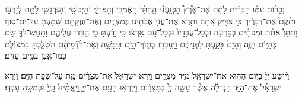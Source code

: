 \documentclass[twoside, openany, parskip=half, 11pt]{book}
\begin{document}
וְכָר֨וֹת עִמּ֜וֹ הַבְּֿרִ֗ית לָתֵ֡ת אֶת־אֶ֩רֶץ֩ הַכְּֿנַֽעֲנִ֨י הַֽחִתִּ֜י הָֽאֱמֹרִ֧י וְהַפְּֿרִזִּ֛י וְהַיְבוּסִ֥י וְהַגִּרְגָּשִׁ֖י לָתֵ֣ת לְזַרְע֑וֹ וַתָּ֨קֶם֙ אֶת־דְּבָרֶ֔יךָ כִּ֥י צַדִּ֖יק אָֽתָּה׃ וַתֵּ֥רֶא אֶת־עֳנִ֥י אֲבֹתֵ֖ינוּ בְּמִצְרָ֑יִם וְאֶת־זַֽעֲקָתָ֥ם שָׁמַ֖עְתָּ עַל־יַם־סֽוּף׃ וַתִּתֵּן֩ אֹתֹ֨ת וּמֹֽפְֿתִ֜ים בְּפַרְעֹ֤ה וּבְכָל־עֲבָדָיו֙ וּבְכָל־עַ֣ם אַרְצ֔וֹ כִּ֣י יָדַ֔עְתָּ כִּ֥י הֵזִ֖ידוּ עֲלֵיהֶ֑ם וַתַּֽעַשׂ־לְךָ֥ שֵׁ֖ם כְּהַיּ֥וֹם הַזֶּֽה׃
 וְהַיָּם֙ בָּקַ֣עְתָּ לִפְנֵיהֶ֔ם וַיַּֽעַבְר֥וּ בְתֽוֹךְ־הַיָּ֖ם בַּיַּבָּשָׁ֑ה וְאֶת־רֹ֨דְֿפֵיהֶ֜ם הִשְׁלַ֧כְתָּ בִמְצוֹלֹ֛ת כְּמוֹ־אֶ֖בֶן בְּמַ֥יִם עַזִּֽים׃

וַיּ֨וֹשַׁע
יְיָ֜ בַּיּ֥וֹם הַה֛וּא אֶת־יִשְׂרָאֵ֖ל מִיַּ֣ד מִצְרָ֑יִם וַיַּ֤רְא יִשְׂרָאֵל֙ אֶת־מִצְרַ֔יִם מֵ֖ת עַל־שְׂפַ֥ת הַיָּֽם׃
 וַיַּ֨רְא יִשְׂרָאֵ֜ל אֶת־הַיָּ֣ד הַגְּֿדֹלָ֗ה אֲשֶׁ֨ר עָשָׂ֤ה יְיָ֙ בְּמִצְרַ֔יִם וַיִּֽירְֿא֥וּ הָעָ֖ם אֶת־יְיָ֑ וַֽיַּֽאֲמִ֨ינוּ֙ בַּֽיְיָ֔ וּבְמֹשֶׁ֖ה עַבְדּֽוֹ׃
\end{document}
